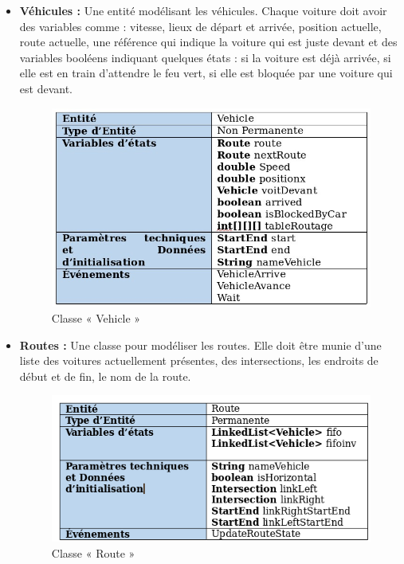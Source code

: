 \documentclass[12pt]{article} %
\begin{document}
\begin{itemize}
\item \textbf{Véhicules :}
Une entité modélisant les véhicules. Chaque voiture doit avoir des variables comme : vitesse, lieux de départ et arrivée, position actuelle, route actuelle, une référence qui indique la voiture qui est juste devant et des variables booléens indiquant quelques états : si la voiture est déjà arrivée, si elle est en train d’attendre le feu vert, si elle est bloquée par une voiture qui est devant.

\begin{figure}[H]
	\centering
	\includegraphics[width=\linewidth]{Vehicle.png}
	\caption{Classe « Vehicle »}
	\label{fig:Vehicle}
\end{figure}

\item \textbf{Routes :}
Une classe pour modéliser les routes. Elle doit être munie d’une liste des voitures actuellement présentes, des intersections, les endroits de début et de fin, le nom de la route.

\begin{figure}[H]
	\centering
	\includegraphics[width=\linewidth]{Route.png}
	\caption{Classe « Route »}
	\label{fig:Route}
\end{figure}


\end{itemize}
\end{document}

